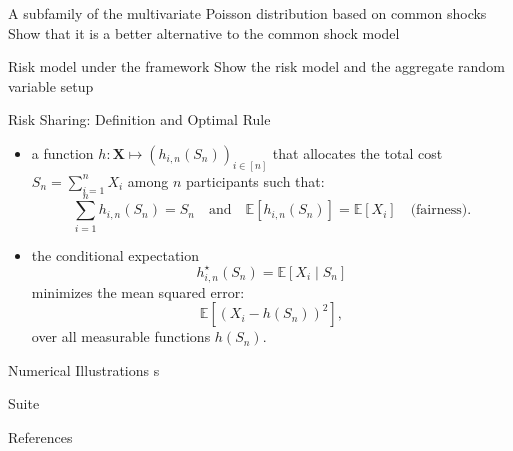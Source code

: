 \documentclass[11pt,xcolor={dvipsnames},hyperref={pdftex,pdfpagemode=UseNone,hidelinks,pdfdisplaydoctitle=true},usepdftitle=false]{beamer}
\begin{document}
\begin{frame}{A subfamily of the multivariate Poisson distribution based on common shocks}
Show that it is a better alternative to the common shock model 
\end{frame}


\begin{frame}{Risk model under the framework}
Show the risk model and the aggregate random variable setup
\end{frame}


\begin{frame}{Risk Sharing: Definition and Optimal Rule}

    \begin{itemize}
        \item {} a function $h: \boldsymbol{X} \mapsto (h_{i,n}(S_n))_{i \in [n]}$ that allocates the total cost $S_n = \sum_{i=1}^n X_i$ among $n$ participants such that:
        \begin{equation*}
        \sum_{i=1}^n h_{i,n}(S_n) = S_n
        \quad \text{and} \quad
        \mathbb{E}[h_{i,n}(S_n)] = \mathbb{E}[X_i] \quad \text{(fairness)}.
        \end{equation*}
        \pause
        \item {} the conditional expectation
        \begin{equation*}
        h_{i,n}^{\star}(S_n) = \mathbb{E}[X_i \mid S_n]
        \end{equation*}
        minimizes the mean squared error:
        \begin{equation*}
        \mathbb{E}\left[(X_i - h(S_n))^2\right],
        \end{equation*}
        over all measurable functions $h(S_n)$.
    \end{itemize}
    \end{frame}

\begin{frame}{Numerical Illustrations}
    s
\end{frame}

\begin{frame}{Suite}
    
\end{frame}

\appendix

\begin{frame}[allowframebreaks]{References}


\end{frame}
\end{document}
